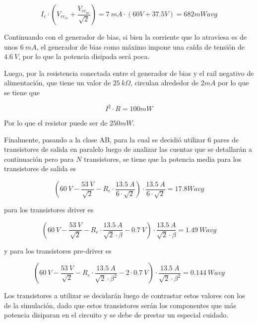 \begin{equation}
I_{c} \cdot (V_{ce_{cc}} + \frac{V_{ce_{ac}}}{\sqrt{2}}) = 7 \ mA \cdot (60V + 37.5V) = 682mW avg
\end{equation}

Continuando con el generador de bias, si bien la corriente que lo atraviesa es de unos $6 \ mA$, el generador de bias como máximo impone una caída de tensión de $4.6 \ V$, por lo que la potencia disipada será poca.

Luego, por la resistencia conectada entre el generador de bias y el rail negativo de alimentación, que tiene un valor de $25 \ k\Omega$, circulan alrededor de $2mA$ por lo que se tiene que

\begin{equation}
I^2 \cdot R = 100mW
\end{equation}

Por lo que el resistor puede ser de $250mW$.

Finalmente, pasando a la clase AB, para la cual se decidió utilizar 6 pares de transistores de salida en paralelo luego de analizar las cuentas que se detallarán a continuación pero para $N$ transistores, se tiene que la potencia media para los transistores de salida es

\begin{equation}
(60 \ V - \frac{53 \ V}{\sqrt{2}} - R_e \cdot \frac{13.5 \ A}{6\cdot \sqrt{2}})\cdot \frac{13.5 \ A}{6\cdot \sqrt{2}} = 17.8W avg
\end{equation}

para los transistores driver es

\begin{equation}
(60 \ V - \frac{53 \ V}{\sqrt{2}} - R_e \cdot \frac{13.5 \ A}{ \sqrt{2} \cdot \beta} - 0.7 \ V)\cdot \frac{13.5 \ A}{ \sqrt{2} \cdot \beta} = 1.49 \ W avg
\end{equation}

y para los transistores pre-driver es

\begin{equation}
(60 \ V - \frac{53 \ V}{\sqrt{2}} - R_e \cdot \frac{13.5 \ A}{ \sqrt{2} \cdot \beta^2} - 2 \cdot 0.7 \ V)\cdot \frac{13.5 \ A}{ \sqrt{2} \cdot \beta^2} = 0.144 \ W avg
\end{equation}

Los transistores a utilizar se decidarán luego de contrastar estos valores con los de la simulación, dado que estos transistores serán los componentes que más potencia disiparan en el circuito y se debe de prestar un especial cuidado.

%
